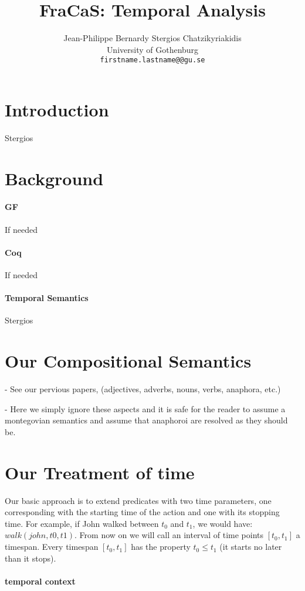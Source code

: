 \documentclass[a4paper,11pt]{article}
\title{FraCaS: Temporal Analysis}
\author{Jean-Philippe Bernardy \qquad Stergios Chatzikyriakidis \\
  University of Gothenburg\\
  {\tt firstname.lastname@@gu.se} \\}
\date{}
\begin{document}
\maketitle

\section{Introduction}
Stergios
\section{Background}
\paragraph{GF}
If needed
\paragraph{Coq}
If needed
\paragraph{Temporal Semantics}
Stergios

\section{Our Compositional Semantics}

- See our pervious papers, (adjectives, adverbs, nouns, verbs, anaphora, etc.)

- Here we simply ignore these aspects and it is safe for the reader to
assume a montegovian semantics and assume that anaphoroi are resolved
as they should be.

\section{Our Treatment of time}

Our basic approach is to extend predicates with two time parameters,
one corresponding with the starting time of the action and one with
its stopping time. For example, if John walked between $t_0$ and
$t_1$, we would have: $walk(john,t0,t1)$. From now on we will call an
interval of time points $[t_0,t_1]$ a timespan. Every timespan
$[t_0,t_1]$ has the property $t_0 ≤ t_1$ (it starts no later than it
stops).

\paragraph{temporal context}
\end{document}
